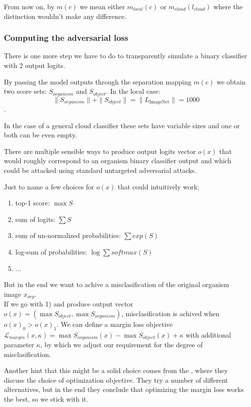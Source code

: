 From now on, by $m(c)$ we mean either $m_{local}(c)$ or $m_{cloud}(l_{cloud})$ where the distinction wouldn't make any difference.

\subsubsection{Computing the adversarial loss}
There is one more step we have to do to transparently simulate a binary classifier with 2 output logits.

By passing the model outputs through the separation mapping $m(c)$ we obtain two score sets: $S_{organism}$ and $S_{object}$. In the local case:
$$\|S_{organism}\| + \|S_{object}\| = \|L_{\text{ImageNet}}\| = 1000$$.

In the case of a general cloud classifier these sets have variable sizes and one or both can be even empty.

There are multiple sensible ways to produce output logits vector $o(x)$ that would roughly correspond to an organism binary classifier output and which could be attacked using standard untargeted adversarial attacks.

Just to name a few choices for $o(x)$ that could intuitively work:
\begin{enumerate}
    \item top-1 score: $\max S$ 
    \item sum of logits: $\sum S$
    \item sum of un-normalized probabilities: $\sum exp(S)$
    \item log-sum of probabilities: $\log \sum softmax(S)$
    \item ...
\end{enumerate}

But in the end we want to achive a misclasification of the original organism image $x_{org}$. \\ If we go with 1) and produce output vector $o(x) = (\max S_{object}, \max S_{organism})$, misclasification is achived when $o(x)_0 > o(x)_1$. We can define a margin loss objective $\mathcal{L}_{margin}(x, \kappa) = \max S_{organism}(x) - \max S_{object}(x) + \kappa$ with additional parameter $\kappa$, by which we adjust our requirement for the degree of misclasification.

Another hint that this might be a solid choice comes from the \cite{carlini2017evaluating}, where they discuss the choice of optimization objective. They try a number of different alternatives, but in the end they conclude that optimizing the margin loss works the best, so we stick with it.


